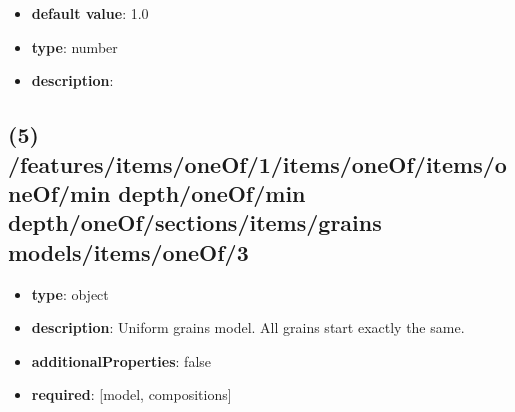 \begin{itemize}[leftmargin=7em]\item {\bf default value}: 1.0
\item {\bf type}: number
\item {\bf description}: 
\end{itemize}\subsection{(5) /features/items/oneOf/1/items/oneOf/items/oneOf/min depth/oneOf/min depth/oneOf/sections/items/grains models/items/oneOf/3}
\begin{itemize}[leftmargin=5em]\item {\bf type}: object
\item {\bf description}: Uniform grains model. All grains start exactly the same.
\item {\bf additionalProperties}: false
\item {\bf required}: [model, compositions]\end{itemize}
